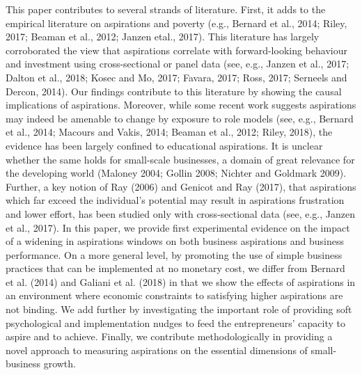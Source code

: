 \documentclass[11.5pt]{article}
\begin{document}
This paper contributes to several strands of literature. First, it adds to the empirical literature on aspirations and poverty (e.g., Bernard et al., 2014; Riley, 2017; Beaman et al., 2012; Janzen etal., 2017). This literature has largely corroborated the view that aspirations correlate with forward-looking behaviour and investment using cross-sectional or panel data (see, e.g., Janzen et al., 2017; Dalton et al., 2018; Kosec and Mo, 2017; Favara, 2017; Ross, 2017; Serneels and Dercon, 2014). Our findings contribute to this literature by showing the causal implications of aspirations. Moreover, while some recent work suggests aspirations may indeed be amenable to change by exposure to role models (see, e.g., Bernard et al., 2014; Macours and Vakis, 2014; Beaman et al., 2012; Riley, 2018), the evidence has been largely confined to educational aspirations. It is unclear whether the same holds for small-scale businesses, a domain of great relevance for the developing world (Maloney 2004; Gollin 2008; Nichter and Goldmark 2009). Further, a key notion of Ray (2006) and Genicot and Ray (2017), that aspirations which far exceed the individual's potential may result in aspirations frustration and lower effort, has been studied only with cross-sectional data (see, e.g., Janzen et al., 2017). In this paper, we provide first experimental evidence on the impact of a widening in aspirations windows on both business aspirations and business performance. On a more general level, by promoting the use of simple business practices that can be implemented at no monetary cost, we differ from Bernard et al. (2014) and Galiani et al. (2018) in that we show the effects of aspirations in an environment where economic constraints to satisfying higher aspirations are not binding. We add further by investigating the important role of providing soft psychological and implementation nudges to feed the entrepreneurs' capacity to aspire and to achieve. %
Finally, we contribute methodologically in providing a novel approach to measuring aspirations on the essential dimensions of small-business growth.
\end{document}
